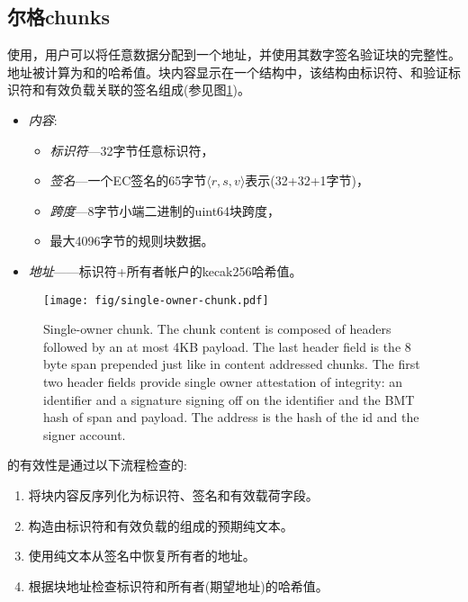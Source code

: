 \subsection{尔格chunks\statusgreen}\label{sec:single-owner-chunks}

使用，用户可以将任意数据分配到一个地址，并使用其数字签名验证块的完整性。地址被计算为和的哈希值。块内容显示在一个结构中，该结构由标识符、和验证标识符和有效负载关联的签名组成(参见图\ref{fig:single-owner-chunks})。

\begin{itemize}
    \item \emph{内容}: 
\begin{itemize}
    \item \emph{标识符}—32字节任意标识符， 
    \item \emph{签名}—一个EC签名的65字节$\langle r,s,v \rangle$表示(32+32+1字节)，
    \item \emph{跨度}—8字节小端二进制的uint64块跨度，
    \item 最大4096字节的规则块数据。
\end{itemize}
    \item \emph{地址}——标识符+所有者帐户的kecak256哈希值。
\end{itemize}

\begin{figure}[htbp]
   \centering
   \texttt{[image: fig/single-owner-chunk.pdf]}
   \caption[Single-owner chunk\statusgreen]{Single-owner chunk. The chunk content is composed of headers followed by an at most 4KB payload. The last header field is the 8 byte span prepended just like in content addressed chunks. The first two header fields provide single owner attestation of integrity: an identifier and a signature signing off on the identifier and the BMT hash of span and payload. The address is the hash of the id and the signer account.}
   \label{fig:single-owner-chunks}
\end{figure}

的有效性是通过以下流程检查的:

\begin{enumerate}
    \item 将块内容反序列化为标识符、签名和有效载荷字段。
    \item 构造由标识符和有效负载的组成的预期纯文本。
    \item 使用纯文本从签名中恢复所有者的地址。
    \item 根据块地址检查标识符和所有者(期望地址)的哈希值。
\end{enumerate}

